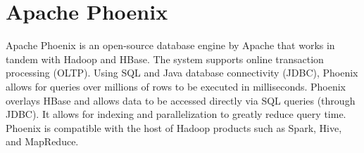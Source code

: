 \section{Apache Phoenix}

Apache Phoenix \cite{www-hid-sp18-526-apache-phoenix} 
is an open-source database engine by Apache that works 
in tandem with Hadoop and HBase. The system supports online 
transaction  processing (OLTP). Using SQL and Java database 
connectivity (JDBC), Phoenix allows for queries over millions of rows 
to be executed in milliseconds. Phoenix overlays HBase and allows 
data to be accessed directly via SQL queries (through JDBC). It allows
for indexing and parallelization to greatly reduce query time. Phoenix
is compatible with the host of Hadoop products such as Spark, Hive, 
and MapReduce.
